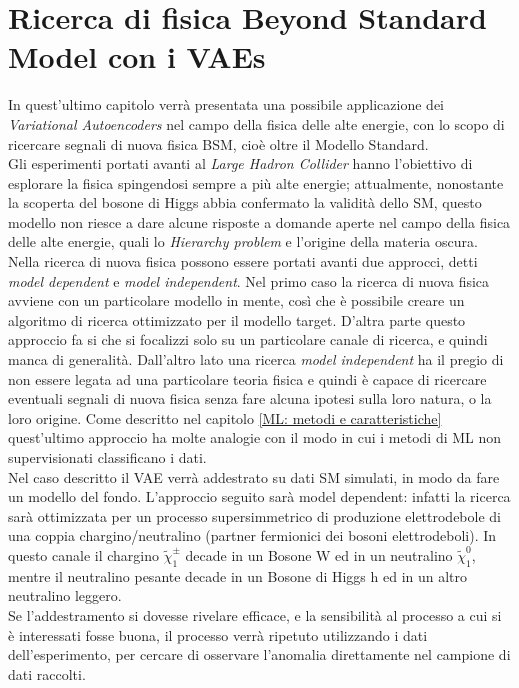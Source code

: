 \section{Ricerca di fisica Beyond Standard Model con i VAEs}
\label{fisica_BSM_VAEs}

In quest'ultimo capitolo verrà presentata una possibile applicazione dei \textit{Variational Autoencoders} nel campo della fisica delle alte energie, con lo scopo di ricercare segnali di nuova fisica BSM, cioè oltre il Modello Standard. \\
Gli esperimenti portati avanti al \textit{Large Hadron Collider} hanno l'obiettivo di esplorare la fisica spingendosi sempre a più alte energie; attualmente, nonostante la scoperta del bosone di Higgs abbia confermato la validità dello SM, questo modello non riesce a dare alcune risposte a domande aperte nel campo della fisica delle alte energie, quali lo \textit{Hierarchy problem} e l'origine della materia oscura. \\
Nella ricerca di nuova fisica possono essere portati avanti due approcci, detti \textit{model dependent} e \textit{model independent}. Nel primo caso la ricerca di nuova fisica avviene con un particolare modello in mente, così che è possibile creare un algoritmo di ricerca ottimizzato per il modello target. D'altra parte questo approccio fa si che si focalizzi solo su un particolare canale di ricerca, e quindi manca di generalità. Dall'altro lato una ricerca \textit{model independent} ha il pregio di non essere legata ad una particolare teoria fisica e quindi è capace di ricercare eventuali segnali di nuova fisica senza fare alcuna ipotesi sulla loro natura, o la loro origine. Come descritto nel capitolo \ref{ML: metodi e caratteristiche} quest'ultimo approccio ha molte analogie con il modo in cui i metodi di ML non supervisionati classificano i dati.\\
Nel caso descritto il VAE verrà addestrato su dati SM simulati, in modo da fare un modello del fondo. L'approccio seguito sarà model dependent: infatti la ricerca sarà ottimizzata per un processo supersimmetrico di produzione elettrodebole di una coppia chargino/neutralino (partner fermionici dei bosoni elettrodeboli). In questo canale il chargino $\tilde{\chi}_1^\pm$ decade in un Bosone W ed in un neutralino $\tilde{\chi}_1^0$, mentre il neutralino pesante decade in un Bosone di Higgs h ed in un altro neutralino leggero.\\
Se l'addestramento si dovesse rivelare efficace, e la sensibilità al processo a cui si è interessati fosse buona, il processo verrà ripetuto utilizzando i dati dell'esperimento, per cercare di osservare l'anomalia direttamente nel campione di dati raccolti. \\
